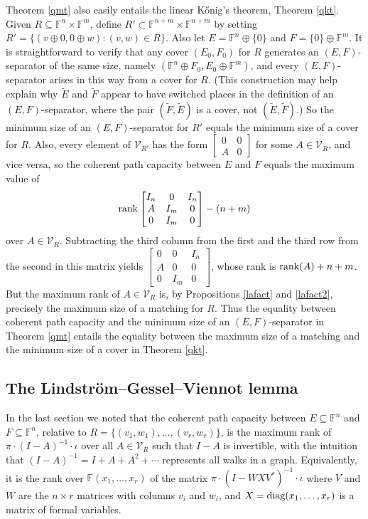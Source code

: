 \documentclass{amsart}
\theoremstyle{definition}
\begin{document}
Theorem \ref{qmt} also easily entails the linear Kőnig's theorem, Theorem \ref{qkt}. Given $R \subseteq \mathbb{F}^n \times \mathbb{F}^m$, define $R' \subset \mathbb{F}^{n+m} \times \mathbb{F}^{n+m}$ by setting $R' = \{(v \oplus 0, 0 \oplus w): (v,w) \in R\}$. Also let $E = \mathbb{F}^n \oplus \{0\}$ and $F = \{0\} \oplus \mathbb{F}^m$. It is straightforward to verify that any cover $(E_0, F_0)$ for $R$ generates an $(E,F)$-separator of the same size, namely $(\mathbb{F}^n \oplus F_0, E_0 \oplus \mathbb{F}^m)$, and every $(E,F)$-separator arises in this way from a cover for $R$. (This construction may help explain why $\tilde{E}$ and $\tilde{F}$ appear to have switched places in the definition of an $(E,F)$-separator, where the pair $(\tilde{F}, \tilde{E})$ is a cover, not $(\tilde{E}, \tilde{F})$.)
So the minimum size of an $(E,F)$-separator for $R'$ equals the minimum size of a cover for $R$. Also, every element of $\mathcal{V}_{R'}$ has the form $\left[\begin{matrix}0&0\\ A&0\end{matrix}\right]$ for some $A \in \mathcal{V}_R$, and vice versa, so the coherent path capacity between $E$ and $F$ equals the maximum value of $${\rm rank}\left[\begin{matrix}I_n&0&I_n\\ A&I_m&0\\ 0&I_m&0\end{matrix}\right] - (n+m)$$ over $A \in \mathcal{V}_R$. Subtracting the third column from the first and the third row from the second in this matrix yields $\left[\begin{matrix}0&0&I_n\\ A&0&0\\ 0&I_m&0\end{matrix}\right]$, whose rank is ${\rm rank}(A) + n + m$. But the maximum rank of $A \in \mathcal{V}_R$ is, by Propositions \ref{lafact} and \ref{lafact2}, precisely the maximum size of a matching for $R$. Thus the equality between coherent path capacity and the minimum size of an $(E,F)$-separator in Theorem \ref{qmt} entails the equality between the maximum size of a matching and the minimum size of a cover in Theorem \ref{qkt}.

\subsection{The Lindström–Gessel–Viennot lemma}

In the last section we noted that the coherent path capacity between $E \subseteq \mathbb{F}^n$ and $F \subseteq \mathbb{F}^n$, relative to $R = \{(v_1, w_1), \ldots, (v_r, w_r)\}$, is the maximum rank of $\pi\cdot (I - A)^{-1}\cdot \iota$ over all $A \in \mathcal{V}_R$ such that $I - A$ is invertible, with the intuition that $(I - A)^{-1} = I + A + A^2 + \cdots$ represents all walks in a graph. Equivalently, it is the rank over $\mathbb{F}(x_1, \ldots, x_r)$ of the matrix $\pi\cdot (I - WXV^*)^{-1}\cdot \iota$ where $V$ and $W$ are the $n \times r$ matrices with columns $v_i$ and $w_i$, and $X = {\rm diag}(x_1, \ldots, x_r)$ is a matrix of formal variables.
\end{document}

